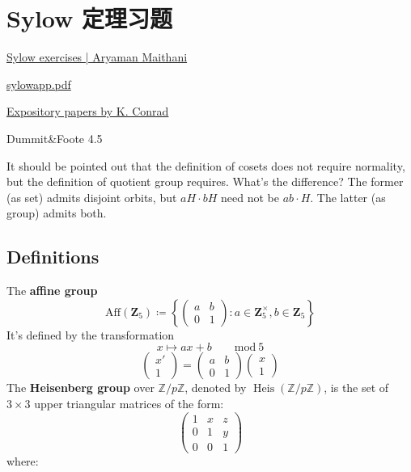 \section{Sylow 定理习题}

\href{https://aryamanmaithani.github.io/alg/groups/sylow-exercises/}{Sylow exercises | Aryaman Maithani}

\href{https://kconrad.math.uconn.edu/blurbs/grouptheory/sylowapp.pdf}{sylowapp.pdf}

\href{https://kconrad.math.uconn.edu/blurbs/}{Expository papers by K. Conrad}

Dummit\&Foote 4.5

\begin{note}
It should be pointed out that the definition of cosets does not require normality, but the definition of quotient group requires. What's the difference? The former (as set) admits disjoint orbits, but $aH\cdot bH$ need not be $ab\cdot H$. The latter (as group) admits both.
\end{note}
\subsection{Definitions}

The \textbf{affine group}
\[
\mathrm{Aff}(\mathbf{Z}_{5})\coloneqq \left\{ \begin{pmatrix}
a & b \\
0 & 1
\end{pmatrix}:a\in \mathbf{Z}_{5}^{\times},b\in \mathbf{Z}_{5} \right\}
\]
It's defined by the transformation
\[
x\mapsto ax+b\qquad \mathrm{mod}\ 5
\]
\[
\begin{pmatrix}
x' \\
1 
\end{pmatrix}
=\begin{pmatrix}
a & b \\
0 & 1
\end{pmatrix}\begin{pmatrix}
x  \\
1
\end{pmatrix}
\]
The \textbf{Heisenberg group} over $\mathbb{Z} / p \mathbb{Z}$, denoted by $\operatorname{Heis}(\mathbb{Z} / p \mathbb{Z})$, is the set of $3 \times 3$ upper triangular matrices of the form:
\[
\left(\begin{array}{lll}
1 & x & z \\
0 & 1 & y \\
0 & 0 & 1
\end{array}\right)
\]
where:


